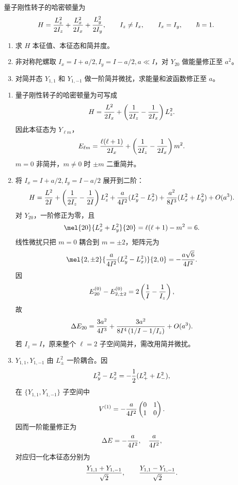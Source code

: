 \begin{question}
量子刚性转子的哈密顿量为
\[
  H={L_z^2\over2I_z}+{L_x^2\over2I_x}+{L_y^2\over2I_y},
  \qquad I_z\ne I_x,
  \qquad I_x=I_y,
  \qquad \hbar=1.
\]
\begin{enumerate}
  \item 求 $H$ 本征值、本征态和简并度。
  \item 非对称陀螺取 $I_x=I+a/2,I_y=I-a/2,a\ll I$，对 $Y_{20}$ 做能量修正至 $a^2$。
  \item 对简并态 $Y_{1,1}$ 和 $Y_{1,-1}$ 做一阶简并微扰，求能量和波函数修正至 $a$。
\end{enumerate}
\begin{solution}
\begin{enumerate}
  \item 量子刚性转子的哈密顿量为可写成
  \[
    H={L^2\over2I_x}+\left({1\over2I_z}-{1\over2I_x}\right)L_z^2.
  \]
  因此本征态为 $Y_{\ell m}$，
  \[
    E_{\ell m}={\ell(\ell+1)\over2I_x}+\left({1\over2I_z}-{1\over2I_x}\right)m^2.
  \]
  $m=0$ 非简并，$m\ne0$ 时 $\pm m$ 二重简并。
  \item 将 $I_x=I+a/2,I_y=I-a/2$ 展开到二阶：
  \[
    H={L^2\over2I}+\left({1\over2I_z}-{1\over2I}\right)L_z^2
    +{a\over4I^2}(L_y^2-L_x^2)+{a^2\over8I^3}(L_x^2+L_y^2)+O(a^3).
  \]
  对 $Y_{20}$，一阶修正为零，且
  \[
    \mel{20}{L_x^2+L_y^2}{20}=\ell(\ell+1)-m^2=6.
  \]
  线性微扰只把 $m=0$ 耦合到 $m=\pm2$，矩阵元为
  \[
    \mel{2,\pm2}{ {a\over4I^2}(L_y^2-L_x^2)}{2,0}=-{a\sqrt6\over4I^2}.
  \]
  因
  \[
    E_{20}^{(0)}-E_{2,\pm2}^{(0)}=2\left({1\over I}-{1\over I_z}\right),
  \]
  故
  \[
    \Delta E_{20}={3a^2\over4I^3}
    +{3a^2\over 8I^4\left(1/I-1/I_z\right)}+O(a^3).
  \]
  若 $I_z=I$，原来整个 $\ell=2$ 子空间简并，需改用简并微扰。
  \item $Y_{1,1},Y_{1,-1}$ 由 $L_\pm^2$ 一阶耦合。因
  \[
    L_y^2-L_x^2=-{1\over2}(L_+^2+L_-^2),
  \]
  在 $\{Y_{1,1},Y_{1,-1}\}$ 子空间中
  \[
    V^{(1)}=-{a\over4I^2}
    \begin{pmatrix}0&1\\1&0\end{pmatrix}.
  \]
  因而一阶能量修正为
  \[
    \Delta E=-{a\over4I^2},\quad {a\over4I^2},
  \]
  对应归一化本征态分别为
  \[
    {Y_{1,1}+Y_{1,-1}\over\sqrt2},
    \qquad {Y_{1,1}-Y_{1,-1}\over\sqrt2}.
  \]
\end{enumerate}
\end{solution}
\end{question}

